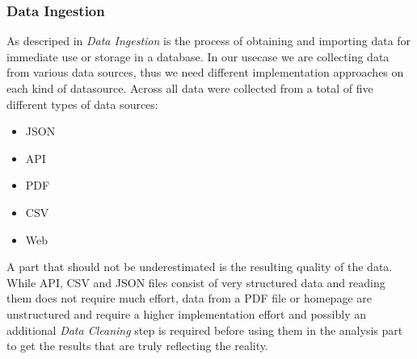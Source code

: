 \subsubsection{Data Ingestion}
\label{subsubsec:ingestion}
As descriped in\cite{ingestion} \textit{Data Ingestion} is the process of obtaining and importing data for immediate use or storage in a database.
In our usecase we are collecting data from various data sources, thus we need different implementation approaches on each kind of datasource.
\newline
Across all  data were collected from a total of five different types of data sources:
\begin{itemize}
  \item \ac{JSON}
  \item \ac{API}
  \item \ac{PDF}
  \item \ac{CSV}
  \item Web
\end{itemize}
A part that should not be underestimated is the resulting quality of the data.
While \ac{API}, \ac{CSV} and \ac{JSON} files consist of very structured data and reading them does not require much effort,
data from a \ac{PDF} file or homepage are unstructured and require a higher implementation effort and possibly an additional
\textit{Data Cleaning} step is required before using them in the analysis part to get the results that are truly reflecting the reality.
%
